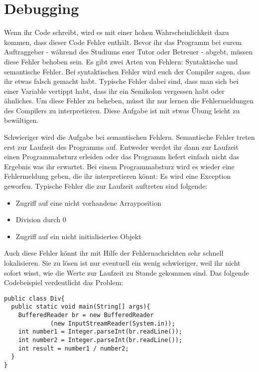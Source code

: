 \chapter{Debugging}

Wenn ihr Code schreibt, wird es mit einer hohen Wahrscheinlichkeit dazu kommen, dass dieser Code Fehler enthält. Bevor ihr das Programm bei eurem Auftraggeber - während des Studiums euer Tutor oder Betreuer - abgebt, müssen diese Fehler behoben sein. Es gibt zwei Arten von Fehlern: Syntaktische und semantische Fehler. Bei syntaktischen Fehler wird euch der Compiler sagen, dass ihr etwas falsch gemacht habt. Typische Fehler dabei sind, dass man sich bei einer Variable vertippt habt, dass ihr ein Semikolon vergessen habt oder ähnliches. Um diese Fehler zu beheben, müsst ihr nur lernen die Fehlermeldungen des Compilers zu interpretieren. Diese Aufgabe ist mit etwas Übung leicht zu bewältigen.

Schwieriger wird die Aufgabe bei semantischen Fehlern. Semantische Fehler treten erst zur Laufzeit des Programms auf. Entweder werdet ihr dann zur Laufzeit einen Programmabsturz erleiden oder das Programm liefert einfach nicht das Ergebnis was ihr erwartet. Bei einem Programmabsturz wird es wieder eine Fehlermeldung geben, die ihr interpretieren könnt: Es wird eine Exception geworfen. Typische Fehler die zur Laufzeit auftreten sind folgende:

\begin{itemize}
	\item Zugriff auf eine nicht vorhandene Arrayposition
	\item Division durch 0
	\item Zugriff auf ein nicht initialisiertes Objekt
\end{itemize}

Auch diese Fehler könnt ihr mit Hilfe der Fehlernachrichten sehr schnell lokalisieren. Sie zu lösen ist nur eventuell ein wenig schwieriger, weil ihr nicht sofort wisst, wie die Werte zur Laufzeit zu Stande gekommen sind. Das folgende Codebeispiel verdeutlicht das Problem:

\begin{minipage}{\textwidth}
\begin{lstlisting}
public class Div{
  public static void main(String[] args){
    BufferedReader br = new BufferedReader
             (new InputStreamReader(System.in));
    int number1 = Integer.parseInt(br.readLine());
    int number2 = Integer.parseInt(br.readLine());
    int result = number1 / number2;
  }
}
\end{lstlisting}
\end{minipage}

